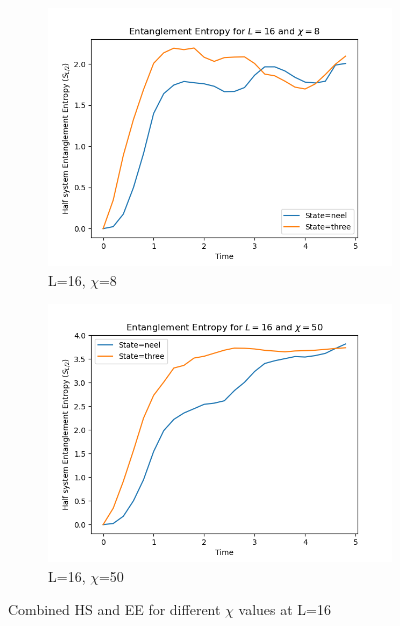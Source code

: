 \documentclass[12pt]{article}
\begin{document}
\begin{figure}[h!]
  \centering
  \begin{subfigure}[b]{0.48\textwidth}
    \centering
    \includegraphics[width=\textwidth]{combined_hs_ee_L_16_chi_8.png}
    \caption{L=16, $\chi$=8}
  \end{subfigure}
  \hfill
  \begin{subfigure}[b]{0.48\textwidth}
    \centering
    \includegraphics[width=\textwidth]{combined_hs_ee_L_16_chi_50.png}
    \caption{L=16, $\chi$=50}
  \end{subfigure}
  
  \caption{Combined HS and EE for different $\chi$ values at L=16}
\end{figure}
\end{document}
